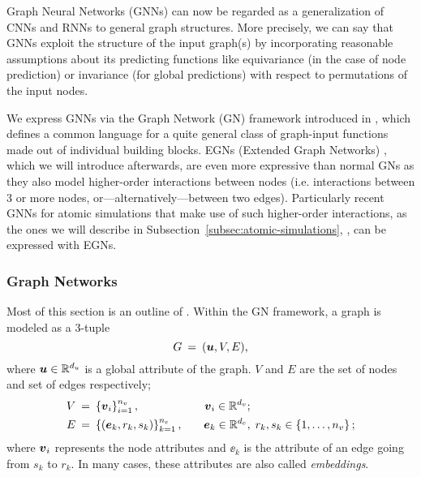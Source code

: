 Graph Neural 
Networks (GNNs) can now be regarded as a generalization of CNNs and RNNs to general graph structures.
More precisely, we can say that GNNs exploit the structure of the input graph(s) by incorporating
reasonable assumptions about its predicting functions like equivariance (in the case of node prediction) or invariance (for global predictions) with respect to permutations of the 
input nodes.

We express GNNs via the Graph Network (GN) framework introduced in 
\cite{https://doi.org/10.48550/arxiv.1806.01261}, which defines
a common language for a quite general class of graph-input functions made out of 
individual building blocks. EGNs (Extended Graph Networks) \cite{https://doi.org/10.48550/arxiv.2203.09697}, which we will 
introduce afterwards, are even more expressive than normal 
GNs as they also model higher-order interactions between nodes (i.e. interactions 
between 3 or more nodes, or---alternatively---between two edges). Particularly recent 
GNNs for atomic simulations that make use of such higher-order interactions, as the ones we will describe 
in Subsection~\ref{subsec:atomic-simulations}, \cite*{DBLP:journals/corr/abs-2003-03123,https://doi.org/10.48550/arxiv.2106.08903}, 
can be expressed with EGNs.

\subsubsection{Graph Networks}
\label{subsubsec:gns}

Most of this section is an outline of \cite[Section 3.2]{https://doi.org/10.48550/arxiv.1806.01261}. 
Within the GN framework, a graph is modeled as a 3-tuple
\[ G \: = \: (\boldsymbol{u}, V, E) \text{,} \]
where $\boldsymbol{u} \in \mathbb{R}^{d_u}$ is a global attribute of the graph. $V$ and $E$ are the set of nodes and
set of edges respectively;
\begin{align*}
    V \: &= \: \left\{\boldsymbol{v}_i\right\}_{i=1}^{n_v},             &\quad \boldsymbol{v}_i \in \mathbb{R}^{d_v}&; \\
    E \: &= \: \left\{(\boldsymbol{e}_k, r_k, s_k)\right\}_{k=1}^{n_e}, &\quad \boldsymbol{e}_k \in \mathbb{R}^{d_e}&, \; r_k, s_k \in \left\{1, \dots, n_v\right\};
\end{align*}
where $\boldsymbol{v}_i$ represents the node attributes and $\ee_k$ is the attribute of an edge
going from $s_k$ to $r_k$. In many cases, these attributes are also called \textit{embeddings}.

